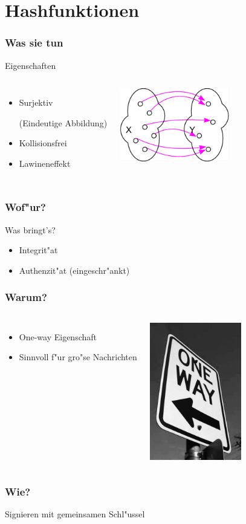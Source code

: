 \section{Hashfunktionen}

\begin{frame}
	\frametitle{Was sie tun}
	Eigenschaften
	\begin{columns}
	\column{6cm}
		\begin{itemize}
			\item Surjektiv \begin{small}(Eindeutige Abbildung)\end{small}
			\item Kollisionsfrei
			\item Lawineneffekt
		\end{itemize}
	\column{6cm}
		\begin{center}
			\includegraphics[width=4.8cm,height=3.2cm]{surjektiv}
		\end{center}
	\end{columns}
\end{frame}

\begin{frame}
	\frametitle{Wof"ur?}
	Was bringt's?
	\begin{itemize}
		\item Integrit"at
		\item Authenzit"at \small{(eingeschr"ankt)}
	\end{itemize}

\end{frame}

\begin{frame}
\frametitle{Warum?}
	\begin{columns}
	\column{6cm}
		\begin{itemize}
			\item One-way Eigenschaft
			\item Sinnvoll f"ur gro"se Nachrichten
		\end{itemize}
	\column{6cm}
		\begin{center}
			\includegraphics[width=4cm,height=6cm]{oneway}
		\end{center}
	\end{columns}
\end{frame}

\begin{frame}
\frametitle{Wie?}
	Signieren mit gemeinsamen Schl"ussel
	\par
\end{frame}


